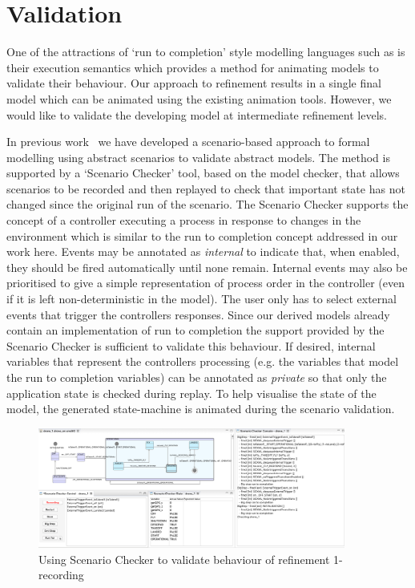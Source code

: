 

\section{Validation}
\label{sec:validation}

One of the attractions of `run to completion' style modelling languages such as \SCXML is their execution semantics which provides a method for animating models to validate their behaviour.
Our approach to \SCXML refinement results in a single \SCXML final model which can be animated using the existing \SCXML animation tools.
However, we would like to validate the developing \UMLB model at intermediate refinement levels. 

In previous work~\cite{snook20JSA} we have developed a scenario-based approach to formal modelling using abstract scenarios to validate abstract models.
The method is supported by a `Scenario Checker' tool, based on the \PROB model checker, that allows scenarios to be recorded and then replayed to check that important state has not changed since the original run of the scenario.
The Scenario Checker supports the concept of a controller executing a process in response to changes in the environment which is similar to the run to completion concept addressed in our work here.
Events may be annotated as \emph{internal} to indicate that, when enabled, they should be fired automatically until none remain.
Internal events may also be prioritised to give a simple representation of process order in the controller (even if it is left non-deterministic in the model).
The user only has to select external events that trigger the controllers responses.
Since our \SCXML derived models already contain an implementation of run to completion the support provided by the Scenario Checker is sufficient to validate this behaviour.
If desired, internal variables that represent the controllers processing (e.g. the variables that model the \SCXML run to completion variables) can be annotated as \emph{private} so that only the application state is checked during replay.
To help visualise the state of the model, the generated \UMLB state-machine is animated during the scenario validation.

\begin{figure}[!th]
	\centering
	\includegraphics[width=0.90\textwidth, trim=30 50 60 0]{figures/scenarioChecker_recording_drone1.png}
	\caption{Using Scenario Checker to validate behaviour of refinement 1- recording}
	\label{fig:scenarioCheckerRecordingDrone1}
\end{figure}

